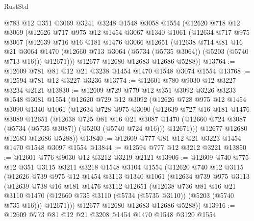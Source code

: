 \begin{lexlean}{RustStd}
\begin{coremodule}
    @783
    @12
    @351
    @3069
    @3241
    @3248
    @1548
    @3058
    @1554
    (@12620
      @718
      @12
      @3069
      (@12626
        @717
        @975
        @12
        @1454
        @3067
        @1340
        @1061
        (@12634
          @717
          @975
          @3067
          (@12639
            @716
            @16
            @181
            @1476
            @3066
            @12651
            (@12638
              @714
              @81
              @16
              @21
              @3064
              @1470
              (@12660 @713 @3064 (@5734 (@5735 @3064)) (@5203 (@5740 @713 @16)))
              @12671)))
        @12677
        @12680
        @12683
        @12686
        @5288))
@13764 := @12609 @781 @81 @12 @21 @3238 @1454 @1470 @1548 @3074 @1554
@13768 := @12594 @781 @12 @3227 @3236
@13774 := @12601 @780 @9030 @12 @3227 @3234 @2121
@13830 := @12609
    @729
    @779
    @12
    @351
    @3092
    @3226
    @3233
    @1548
    @3081
    @1554
    (@12620
      @729
      @12
      @3092
      (@12626
        @728
        @975
        @12
        @1454
        @3090
        @1340
        @1061
        (@12634
          @728
          @975
          @3090
          (@12639
            @727
            @16
            @181
            @1476
            @3089
            @12651
            (@12638
              @725
              @81
              @16
              @21
              @3087
              @1470
              (@12660 @724 @3087 (@5734 (@5735 @3087)) (@5203 (@5740 @724 @16)))
              @12671)))
        @12677
        @12680
        @12683
        @12686
        @5288))
@13840 := @12609 @777 @81 @12 @21 @3223 @1454 @1470 @1548 @3097 @1554
@13844 := @12594 @777 @12 @3212 @3221
@13850 := @12601 @776 @9030 @12 @3212 @3219 @2121
@13906 := @12609
    @740
    @775
    @12
    @351
    @3115
    @3211
    @3218
    @1548
    @3104
    @1554
    (@12620
      @740
      @12
      @3115
      (@12626
        @739
        @975
        @12
        @1454
        @3113
        @1340
        @1061
        (@12634
          @739
          @975
          @3113
          (@12639
            @738
            @16
            @181
            @1476
            @3112
            @12651
            (@12638
              @736
              @81
              @16
              @21
              @3110
              @1470
              (@12660 @735 @3110 (@5734 (@5735 @3110)) (@5203 (@5740 @735 @16)))
              @12671)))
        @12677
        @12680
        @12683
        @12686
        @5288))
@13916 := @12609 @773 @81 @12 @21 @3208 @1454 @1470 @1548 @3120 @1554

\end{coremodule}
\end{lexlean}
